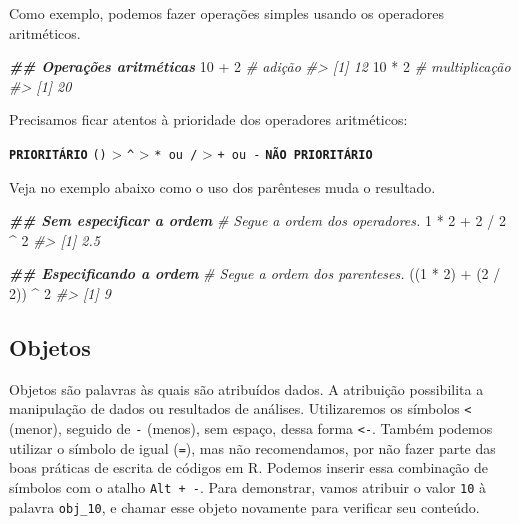 \documentclass[
]{book}
\newenvironment{Shaded}{\begin{snugshade}}{\end{snugshade}}
\newcommand{\CommentTok}[1]{\textcolor[rgb]{0.37,0.37,0.37}{\textit{#1}}}
\newcommand{\DecValTok}[1]{\textcolor[rgb]{0.06,0.06,0.06}{#1}}
\newcommand{\DocumentationTok}[1]{\textcolor[rgb]{0.37,0.37,0.37}{\textbf{\textit{#1}}}}
\newcommand{\NormalTok}[1]{#1}
\newcommand{\SpecialCharTok}[1]{\textcolor[rgb]{0,0,0}{#1}}
\renewenvironment{quote}{\begin{VF}}{\end{VF}}
\begin{document}
Como exemplo, podemos fazer operações simples usando os operadores aritméticos.

\begin{Shaded}
\begin{Highlighting}[]
\DocumentationTok{\#\# Operações aritméticas}
\DecValTok{10} \SpecialCharTok{+} \DecValTok{2} \CommentTok{\# adição}
\CommentTok{\#\textgreater{} [1] 12}
\DecValTok{10} \SpecialCharTok{*} \DecValTok{2} \CommentTok{\# multiplicação}
\CommentTok{\#\textgreater{} [1] 20}
\end{Highlighting}
\end{Shaded}

Precisamos ficar atentos à prioridade dos operadores aritméticos:

\begin{quote}
\textbf{\texttt{PRIORITÁRIO}} \texttt{()} \textgreater{} \texttt{\^{}} \textgreater{} \texttt{*\ ou\ /} \textgreater{} \texttt{+\ ou\ -} \textbf{\texttt{NÃO\ PRIORITÁRIO}}
\end{quote}

Veja no exemplo abaixo como o uso dos parênteses muda o resultado.

\begin{Shaded}
\begin{Highlighting}[]
\DocumentationTok{\#\# Sem especificar a ordem}
\CommentTok{\# Segue a ordem dos operadores.}
\DecValTok{1} \SpecialCharTok{*} \DecValTok{2} \SpecialCharTok{+} \DecValTok{2} \SpecialCharTok{/} \DecValTok{2} \SpecialCharTok{\^{}} \DecValTok{2}
\CommentTok{\#\textgreater{} [1] 2.5}

\DocumentationTok{\#\# Especificando a ordem}
\CommentTok{\# Segue a ordem dos parenteses.}
\NormalTok{((}\DecValTok{1} \SpecialCharTok{*} \DecValTok{2}\NormalTok{) }\SpecialCharTok{+}\NormalTok{ (}\DecValTok{2} \SpecialCharTok{/} \DecValTok{2}\NormalTok{)) }\SpecialCharTok{\^{}} \DecValTok{2}
\CommentTok{\#\textgreater{} [1] 9}
\end{Highlighting}
\end{Shaded}

\hypertarget{objetos}{%
\subsection{Objetos}\label{objetos}}

Objetos são palavras às quais são atribuídos dados. A atribuição possibilita a manipulação de dados ou resultados de análises. Utilizaremos os símbolos \texttt{\textless{}} (menor), seguido de \texttt{-} (menos), sem espaço, dessa forma \texttt{\textless{}-}. Também podemos utilizar o símbolo de igual (\texttt{=}), mas não recomendamos, por não fazer parte das boas práticas de escrita de códigos em R. Podemos inserir essa combinação de símbolos com o atalho \texttt{Alt\ +\ -}. Para demonstrar, vamos atribuir o valor \texttt{10} à palavra \texttt{obj\_10}, e chamar esse objeto novamente para verificar seu conteúdo.
\end{document}

